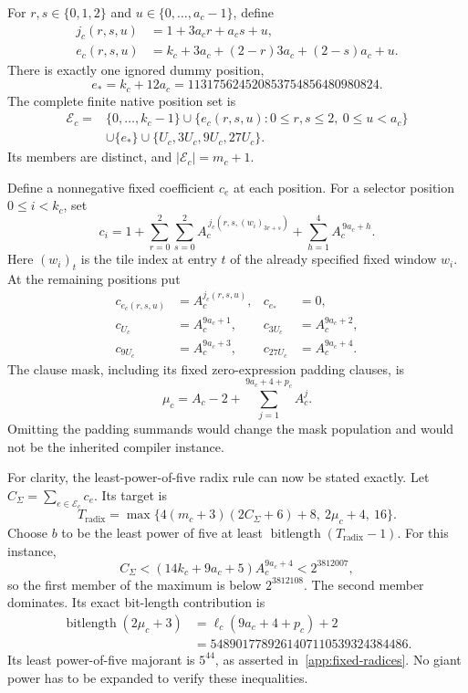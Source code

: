 For $r,s\in\{0,1,2\}$ and $u\in\{0,\ldots,a_c-1\}$, define
\begin{align}
 j_c(r,s,u)&=1+3a_cr+a_cs+u,\label{app:clause-index}\\
 e_c(r,s,u)&=k_c+3a_c+(2-r)3a_c+(2-s)a_c+u.
 \label{app:payload-position}
\end{align}
There is exactly one ignored dummy position,
\[
 e_* = k_c+12a_c =113175624520853754856480980824.
\]
The complete finite native position set is
\begin{align}
 \mathcal E_c={}&\{0,\ldots,k_c-1\}
 \cup\{e_c(r,s,u):0\leq r,s\leq2,\ 0\leq u<a_c\}
 \nonumber\\
 &\cup\{e_*\}\cup\{U_c,3U_c,9U_c,27U_c\}.
 \label{app:native-positions}
\end{align}
Its members are distinct, and $|\mathcal E_c|=m_c+1$.

Define a nonnegative fixed coefficient $c_e$ at each position. For a
selector position $0\leq i<k_c$, set
\begin{equation}\label{app:selector-coefficient}
 c_i=1+
 \sum_{r=0}^{2}\sum_{s=0}^{2}
 A_c^{\,j_c(r,s,(w_i)_{3r+s})}
 +\sum_{h=1}^{4}A_c^{\,9a_c+h}.
\end{equation}
Here $(w_i)_t$ is the tile index at entry $t$ of the already specified
fixed window $w_i$. At the remaining positions put
\begin{align}
 c_{e_c(r,s,u)}&=A_c^{j_c(r,s,u)},&c_{e_*}&=0,\nonumber\\
 c_{U_c}&=A_c^{9a_c+1},&c_{3U_c}&=A_c^{9a_c+2},\nonumber\\
 c_{9U_c}&=A_c^{9a_c+3},&c_{27U_c}&=A_c^{9a_c+4}.
 \label{app:other-coefficients}
\end{align}
The clause mask, including its fixed zero-expression padding clauses, is
\begin{equation}\label{app:clause-mask}
 \mu_c=A_c-2+\sum_{j=1}^{9a_c+4+p_c}A_c^j.
\end{equation}
Omitting the padding summands would change the mask population and would
not be the inherited compiler instance.

For clarity, the least-power-of-five radix rule can now be stated exactly.
Let $C_\Sigma=\sum_{e\in\mathcal E_c}c_e$. Its target is
\[
 T_{\mathrm{radix}}=
 \max\{4(m_c+3)(2C_\Sigma+6)+8,\ 2\mu_c+4,\ 16\}.
\]
Choose $b$ to be the least power of five at least
$\operatorname{bitlength}(T_{\mathrm{radix}}-1)$.
For this instance,
\[
 C_\Sigma<(14k_c+9a_c+5)A_c^{9a_c+4}<2^{3812007},
\]
so the first member of the maximum is below $2^{3812108}$.
The second member dominates. Its exact bit-length contribution is
\begin{align*}
 \operatorname{bitlength}(2\mu_c+3)
 &=\ell_c(9a_c+4+p_c)+2\\
 &=5489017789261407110539324384486.
\end{align*}
Its least power-of-five majorant is $5^{44}$, as asserted
in~\eqref{app:fixed-radices}. No giant power has to be expanded to verify
these inequalities.

